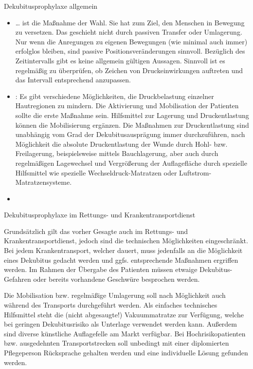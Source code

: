 {Dekubitusprophylaxe allgemein}
{
\begin{itemize}
  \item {} \ldots{} ist die Maßnahme der
  Wahl. Sie hat zum Ziel, den Menschen in Bewegung zu
  versetzen. Das geschieht nicht durch passiven Transfer oder Umlagerung.
  Nur wenn die Anregungen zu eigenen Bewegungen (wie minimal
  auch immer) erfolglos bleiben, sind passive
  Positionsveränderungen sinnvoll. Bezüglich des
  Zeitintervalls gibt es keine allgemein gültigen Aussagen.
  Sinnvoll ist es regelmäßig zu überprüfen, ob Zeichen von Druckeinwirkungen auftreten
  und das Intervall entsprechend anzupassen.
  \item {}: Es gibt verschiedene
  Möglichkeiten, die Druckbelastung einzelner Hautregionen zu mindern. Die
  Aktivierung und Mobilisation der Patienten sollte die
  erste Maßnahme sein. Hilfsmittel zur Lagerung und
  Druckentlastung können die Mobilisierung ergänzen. Die
  Maßnahmen zur Druckentlastung sind unabhängig vom Grad der
  Dekubitusausprägung immer durchzuführen, nach Möglichkeit
  die absolute Druckentlastung der Wunde durch Hohl- bzw.
  Freilagerung, beispielsweise mittels Bauchlagerung, aber
  auch durch regelmäßigen Lagewechsel und Vergrößerung der
  Auflagefläche durch spezielle Hilfsmittel wie spezielle
  Wechseldruck-Matratzen oder Luftstrom-Matratzensysteme.
  \cite{Pflegewiki:Dekubitus}
  \item {}
\end{itemize}


}
{}
{}
{}
{}




{Dekubitusprophylaxe im Rettungs- und
Krankentransportdienst}
{
Grundsätzlich gilt das vorher Gesagte auch im Rettungs- und
Krankentransportdienst, jedoch sind die technischen
Möglichkeiten eingeschränkt. Bei jedem Krankentransport,
welcher  dauert, muss jedenfalls
an die Möglichkeit eines Dekubitus gedacht werden und ggfs.
entsprechende Maßnahmen ergriffen werden. Im Rahmen der
Übergabe des Patienten müssen etwaige Dekubitus-Gefahren
oder bereits vorhandene Geschwüre besprochen werden.

Die Mobilisation bzw. regelmäßige Umlagerung soll nach
Möglichkeit auch während des Transports durchgeführt
werden. Als einfaches technisches Hilfsmittel steht die
(nicht abgesaugte!) Vakuummatratze zur Verfügung, welche bei
geringen Dekubitusrisiko als Unterlage verwendet werden
kann. Außerdem sind diverse künstliche
Auflagefelle am Markt verfügbar. Bei Hochrisikopatienten
bzw. ausgedehnten Transportstrecken soll unbedingt mit einer
diplomierten Pflegeperson Rücksprache gehalten werden und
eine individuelle Lösung gefunden werden.

}
{}
{}
{}
{}


